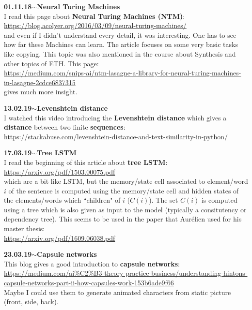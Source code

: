 \documentclass[11pt,a4paper]{article}
\newenvironment{loggentry}[2]%
{\noindent\textbf{#1}\hspace{1cm}$\mathbf{\sim}$\text{ }\textbf{#2}\\}{\vspace{0.5cm}}
\begin{document}
\begin{loggentry}{01.11.18}{Neural Turing Machines}

I read this page about \textbf{Neural Turing Machines (NTM)}:\\
\url{https://blog.acolyer.org/2016/03/09/neural-turing-machines/}\\
and even if I didn't understand every detail, it was interesting. One has to see how far these Machines can learn. The article focuses on some very basic tasks like copying. This topic was also mentioned in the course about Synthesis and other topics of ETH. This page:\\
\url{https://medium.com/snips-ai/ntm-lasagne-a-library-for-neural-turing-machines-in-lasagne-2cdce6837315}\\
gives much more insight.\\

\end{loggentry}


\begin{loggentry}{13.02.19}{Levenshtein distance}

I watched this video introducing the \textbf{Levenshtein distance} which gives a \textbf{distance} between two finite \textbf{sequences}:\\
\url{https://stackabuse.com/levenshtein-distance-and-text-similarity-in-python/}

\end{loggentry}


\begin{loggentry}{17.03.19}{Tree LSTM}

I read the beginning of this article about \textbf{tree LSTM}:\\
\url{https://arxiv.org/pdf/1503.00075.pdf}\\
which are a bit like LSTM, but the memory/state cell associated to element/word $i$ of the sentence is computed using the memory/state cell and hidden states of the elements/words which ``children" of $i$ ($C(i)$). The set $C(i)$ is computed using a tree which is also given as input to the model (typically a consitutency or dependency tree). This seems to be used in the paper that Aurélien used for his master thesis:\\
\url{https://arxiv.org/pdf/1609.06038.pdf}\\

\end{loggentry}


\begin{loggentry}{23.03.19}{Capsule networks}

This blog gives a good introduction to \textbf{capsule networks}:\\
\url{https://medium.com/ai%C2%B3-theory-practice-business/understanding-hintons-capsule-networks-part-ii-how-capsules-work-153b6ade9f66}\\
Maybe I could use them to generate animated characters from static picture (front, side, back).

\end{loggentry}
\end{document}
